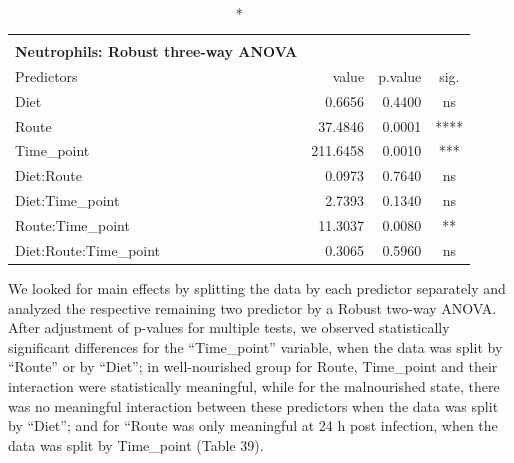 \documentclass[
  12pt,
  letterpaper,
]{article}
\begin{document}
\begin{longtable}{l|rrc}
\caption*{
{\large \textbf{Appendix Table 38}} \\ 
{\small \textbf{Neutrophils: Robust three-way ANOVA}}
} \\ 
\toprule
\multicolumn{1}{l}{Predictors} & value & p.value & sig. \\ 
\midrule\addlinespace[2.5pt]
Diet & 0.6656 & 0.4400 & ns \\ 
Route & 37.4846 & 0.0001 & **** \\ 
Time\_point & 211.6458 & 0.0010 & *** \\ 
Diet:Route & 0.0973 & 0.7640 & ns \\ 
Diet:Time\_point & 2.7393 & 0.1340 & ns \\ 
Route:Time\_point & 11.3037 & 0.0080 & ** \\ 
Diet:Route:Time\_point & 0.3065 & 0.5960 & ns \\ 
\bottomrule
\end{longtable}

We looked for main effects by splitting the data by each predictor separately and analyzed the respective remaining two predictor by a Robust two-way ANOVA. After adjustment of p-values for multiple tests, we observed statistically significant differences for the ``Time\_point'' variable, when the data was split by ``Route'' or by ``Diet''; in well-nourished group for Route, Time\_point and their interaction were statistically meaningful, while for the malnourished state, there was no meaningful interaction between these predictors when the data was split by ``Diet''; and for ``Route was only meaningful at 24 h post infection, when the data was split by Time\_point (Table 39).
\end{document}
